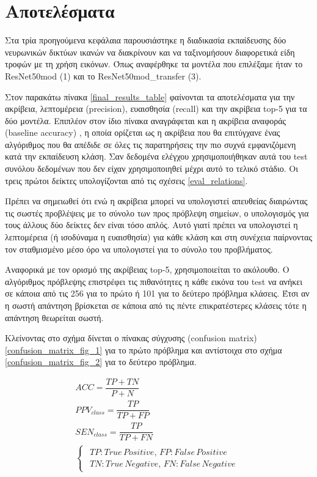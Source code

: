 \vspace{-2em}
\section{Αποτελέσματα}
\label{Final_Results}

Στα τρία προηγούμενα κεφάλαια παρουσιάστηκε η διαδικασία εκπαίδευσης δύο νευρωνικών δικτύων ικανών να διακρίνουν και να ταξινομήσουν διαφορετικά είδη τροφών με τη χρήση εικόνων. Όπως αναφέρθηκε τα μοντέλα που επιλέξαμε ήταν το ResNet50mod (1) και το ResNet50mod\_transfer (3). 

Στον παρακάτω πίνακα \ref{final_results_table}
φαίνονται τα αποτελέσματα για την ακρίβεια, λεπτομέρεια (precision), ευαισθησία (recall) και την ακρίβεια top-5 για τα δύο μοντέλα. Επιπλέον στον ίδιο πίνακα αναγράφεται και η ακρίβεια αναφοράς (baseline accuracy) , η οποία ορίζεται ως η ακρίβεια που θα επιτύγχανε ένας αλγόριθμος που θα απέδιδε σε όλες τις παρατηρήσεις την πιο συχνά εμφανιζόμενη κατά την εκπαίδευση κλάση.  Σαν δεδομένα ελέγχου χρησιμοποιήθηκαν αυτά του test συνόλου δεδομένων που δεν είχαν χρησιμοποιηθεί μέχρι αυτό το τελικό στάδιο. Οι τρεις πρώτοι δείκτες υπολογίζονται από τις σχέσεις \ref{eval_relations}.  

Πρέπει να σημειωθεί ότι ενώ η ακρίβεια μπορεί να υπολογιστεί απευθείας διαιρώντας τις σωστές προβλέψεις με το σύνολο των προς πρόβλεψη σημείων, ο υπολογισμός για τους άλλους δύο δείκτες δεν είναι τόσο απλός. Αυτό γιατί πρέπει να υπολογιστεί η λεπτομέρεια (ή ισοδύναμα η ευαισθησία) για κάθε κλάση και στη συνέχεια παίρνοντας τον σταθμισμένο μέσο όρο να υπολογιστεί για το σύνολο του προβλήματος. 

Αναφορικά με τον ορισμό της ακρίβειας top-5, χρησιμοποιείται το ακόλουθο. Ο αλγόριθμος πρόβλεψης επιστρέφει τις πιθανότητες η κάθε εικόνα του test να ανήκει σε κάποια από τις 256 για το πρώτο ή 101 για το δεύτερο πρόβλημα κλάσεις. Έτσι αν η σωστή απάντηση βρίσκεται σε κάποια από τις πέντε επικρατέστερες κλάσεις τότε η απάντηση θεωρείται σωστή. 

Κλείνοντας στο σχήμα δίνεται ο πίνακας σύγχυσης (confusion matrix) \ref{confusion_matrix_fig_1} για το πρώτο πρόβλημα και αντίστοιχα στο σχήμα \ref{confusion_matrix_fig_2} για το δεύτερο πρόβλημα.

\begin{subequations} \label{eval_relations}
\begin{gather}
ACC=\dfrac{TP+TN}{P+N} \label{accuracy} \tag{4.1.1a}\\
PPV_{class}=\dfrac{TP}{TP+FP} \label{precision_PPV} \tag{4.1.1b}\\
SEN_{class}=\dfrac{TP}{TP+FN} \label{recall} \tag{4.1.1c}\\
\begin{cases}
\begin{aligned}
TP : True \, Positive, \, FP : False \, Positive \\
TN : True \, Negative, \, FN : False \, Negative 
\end{aligned} \tag{4.1.1e}
\end{cases}
\end{gather}
\end{subequations}


